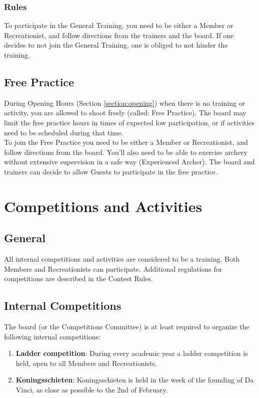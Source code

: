 \documentclass[a4paper]{article}
\newcommand{\Awr}{Contest Rules} %
\begin{document}
\subsubsection{Rules}
To participate in the General Training, you need to be either a Member or Recreationist, and follow directions from the trainers and the board. If one decides to not join the General Training, one is obliged to not hinder the training. 

\subsection{Free Practice}
During Opening Hours (Section \ref{section:opening}) when there is no training or activity, you are allowed to shoot freely (called: Free Practice). The board may limit the free practice hours in times of expected low participation, or if activities need to be scheduled during that time. \\

To join the Free Practice you need to be either a Member or Recreationist, and follow directions from the board. You'll also need to be able to exercise archery without extensive supervision in a safe way (Experienced Archer). The board and trainers can decide to allow Guests to participate in the free practice.

\section{Competitions and Activities}
\subsection{General}
All internal competitions and activities are considered to be a training. Both Members and Recreationists can participate. Additional regulations for competitions are described in the \Awr .

\subsection{Internal Competitions}
The board (or the Competitions Committee) is at least required to organize the following internal competitions: \\
\begin{enumerate}
\item \textbf{Ladder competition}: During every academic year a ladder competition is held, open to all Members and Recreationists.
\item \textbf{Koningsschieten}: Koningsschieten is held in the week of the founding of Da Vinci, as close as possible to the 2nd of February.
\end{enumerate}
\end{document}
